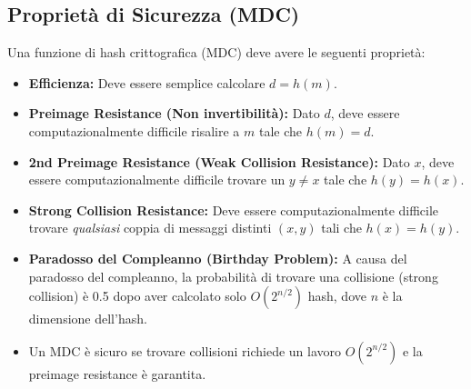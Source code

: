 \documentclass[../main.tex]{subfiles}
\begin{document}
\subsection{Proprietà di Sicurezza (MDC)}
Una funzione di hash crittografica (MDC) deve avere le seguenti proprietà:
\begin{itemize}
	\item \textbf{Efficienza:} Deve essere semplice calcolare $d=h(m)$.
	\item \textbf{Preimage Resistance (Non invertibilità):} Dato $d$, deve essere computazionalmente difficile risalire a $m$ tale che $h(m)=d$.
	\item \textbf{2nd Preimage Resistance (Weak Collision Resistance):} Dato $x$, deve essere computazionalmente difficile trovare un $y \neq x$ tale che $h(y) = h(x)$.
	\item \textbf{Strong Collision Resistance:} Deve essere computazionalmente difficile trovare \emph{qualsiasi} coppia di messaggi distinti $(x, y)$ tali che $h(x) = h(y)$.
	\item \textbf{Paradosso del Compleanno (Birthday Problem):} A causa del paradosso del compleanno, la probabilità di trovare una collisione (strong collision) è 0.5 dopo aver calcolato solo $O(2^{n/2})$ hash, dove $n$ è la dimensione dell'hash.
	\item Un MDC è sicuro se trovare collisioni richiede un lavoro $O(2^{n/2})$ e la preimage resistance è garantita.
\end{itemize}
\end{document}
